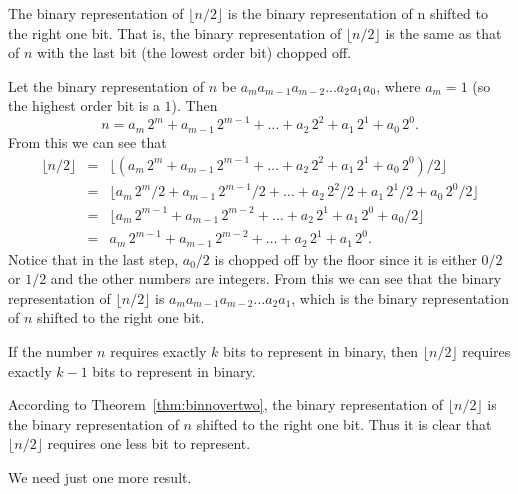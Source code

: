 \begin{thm}\label{thm:binnovertwo}
The binary representation of $\lfloor n/2\rfloor$ 
is the binary representation of n shifted to the right one bit.  
That is, the binary representation of $\lfloor n/2\rfloor$  is the same as that of 
$n$ with the last bit (the lowest order bit) chopped off.
\begin{pf}
Let the binary representation of
$n$ be $a_m a_{m-1}a_{m-2}\ldots a_2a_1a_0$, where $a_m=1$
(so the highest order bit is a $1$).  
Then 
$$n=a_m\, 2^m + a_{m-1}\, 2^{m-1}+ \ldots+ a_2\, 2^2 + a_1\, 2^1 +a_0\, 2^0.$$
From this we can see that
\begin{eqnarray*}
\lfloor n/2\rfloor
&=&\lfloor (a_m\, 2^m + a_{m-1}\, 2^{m-1} + 
    \ldots+ a_2\, 2^2 + a_1\, 2^1 + a_0\, 2^0)/2\rfloor \\
&=&  \lfloor a_m\, 2^m/2 + a_{m-1}\, 2^{m-1}/2 + 
    \ldots+ a_2\, 2^2/2 + a_1\, 2^1/2 + a_0\, 2^0/2\rfloor \\
&=&  \lfloor a_m\, 2^{m-1} + a_{m-1}\, 2^{m-2} + 
    \ldots+ a_2\, 2^1 + a_1\, 2^0 + a_0/2\rfloor\\
&=&  a_m\, 2^{m-1} + a_{m-1}\, 2^{m-2} + 
    \ldots+ a_2\, 2^1 + a_1\, 2^0.
\end{eqnarray*}
Notice that in the last step, $a_0/2$ is chopped off by the floor since it is
either $0/2$ or $1/2$ and the other numbers are integers.
From this we can see that the binary representation of 
$\lfloor n/2\rfloor$  is $a_ma_{m-1}a_{m-2}\ldots a_2a_1$, 
which is the binary representation of $n$ shifted to the right one bit.
\end{pf}
\end{thm}
\begin{cor}\label{cor:kbits}
If the number $n$ requires exactly $k$ bits to represent in binary, 
then $\lfloor n/2\rfloor$ requires exactly $k-1$ bits to represent in binary.
\begin{pf}
According to Theorem~\ref{thm:binnovertwo}, 
the binary representation of $\lfloor n/2\rfloor$ is the binary representation of
$n$ shifted to the right one bit.  
Thus it is clear that $\lfloor n/2\rfloor$ requires one less bit to represent.
\end{pf}
\end{cor}

We need just one more result.

